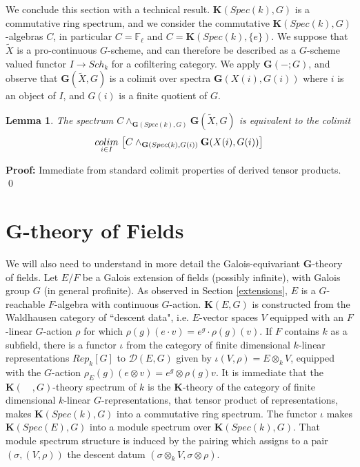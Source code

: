 \documentclass[11pt]{article}
\newcommand\mb{\mathbb}
\def \bK{\mathbf K}
\newcommand\mfk{\mathbf G}
\newtheorem{Lemma}{Lemma}[section]
\newenvironment{Proof}{\par\noindent\textbf{Proof:}}
{\qed}
\begin{document}
We conclude this section with a technical result. $\bK(Spec(k), G)$ is a commutative ring spectrum, and we consider the  commutative $\bK(Spec(k), G)$-algebras $C$, in particular $C = \mb{F}_{\ell}$ and $C = \bK(Spec(k), \{ e \} )$.  
We suppose that $\tilde{X}$ is a pro-continuous $G$-scheme, and can therefore be described as a $G$-scheme valued functor $I \rightarrow Sch_k$ for a cofiltering category.  We apply $\mfk(-;G)$, and observe that $\mfk(\tilde{X},G)$ is a colimit over spectra $\mfk(X(i), G(i))$ where $i$ is an object of $I$, and $G(i)$ is a finite quotient of $G$.  
\begin{Lemma}\label{tensorcolim}
    The spectrum $C \wedge_{\mfk(Spec(k),G)}\mfk(\tilde{X},G)$ is equivalent to the colimit $$\underset{i \in I}{colim}\hspace{.05cm}  \left[ C \wedge _{\mfk(Spec(k),G(i))} \mfk(X(i), G(i)) \right]$$ 
\end{Lemma}
    \begin{Proof}
        Immediate from standard colimit properties of derived tensor products.  
    \end{Proof}
    



\section{G-theory of Fields}

We will also need to understand in more detail the Galois-equivariant $\mfk$-theory of fields.  Let $E/F$ be a Galois extension of fields (possibly infinite), with Galois group $G$ (in general profinite).  As observed in Section \ref{extensions}, $E$ is a $G$-reachable $F$-algebra with continuous $G$-action.  $\bK(E, G) $ is constructed from the Waldhausen category  of ``descent data", i.e. $E$-vector spaces $V$ equipped with an  $F$-linear $G$-action $\rho$  for which $\rho(g) (e \cdot v)  = e^g \cdot \rho(g)(v)$. If $F$ contains  $k$ as a subfield,  there is a functor  $\iota $ from the category of finite dimensional $k$-linear representations $Rep_k [G]$ to $\mathcal{D}(E,G)$ given by $\iota(V,\rho) =  E \otimes _kV$, equipped with the $G$-action $\rho _E(g) (e \otimes v ) = e^g \otimes \rho (g)v$. It is immediate that the $\bK(\quad, G)$-theory spectrum of $k $ is the $\bK$-theory of the category of finite dimensional $k$-linear $G$-representations, that tensor product of representations,  makes $\bK(Spec(k), G) $ into a commutative ring spectrum.  The   functor $\iota$ makes  $\bK(Spec(E), G)$ into a module spectrum over $\bK(Spec(k), G)$. That module spectrum structure is induced by the pairing which assigns to a pair $(\sigma , (V, \rho ))$ the descent datum $(\sigma \otimes _k V, \sigma \otimes \rho)$.  
\end{document}
